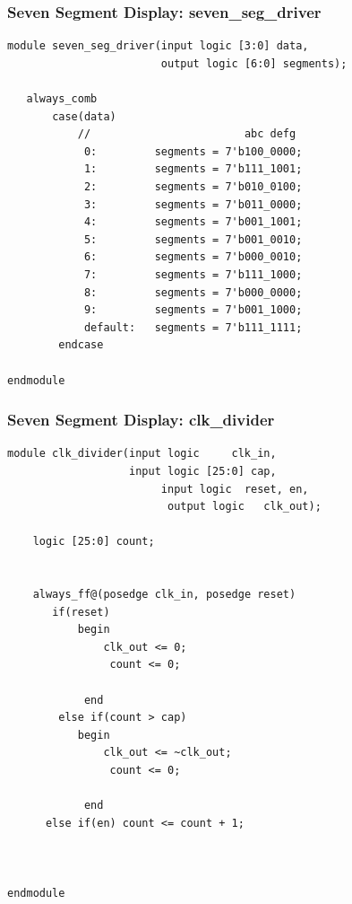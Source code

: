 \documentclass[a4paper]{article}
\begin{document}
\subsubsection{Seven Segment Display: seven_seg_driver}
\begin{Verbatim}
module seven_seg_driver(input logic [3:0] data,
                        output logic [6:0] segments);
								
   always_comb
	   case(data)
		   //                        abc defg
			0:         segments = 7'b100_0000;
			1:         segments = 7'b111_1001;
			2:         segments = 7'b010_0100;
			3:         segments = 7'b011_0000;
			4:         segments = 7'b001_1001;
			5:         segments = 7'b001_0010;
			6:         segments = 7'b000_0010;
			7:         segments = 7'b111_1000;
			8:         segments = 7'b000_0000;
			9:         segments = 7'b001_1000;
			default:   segments = 7'b111_1111;
		endcase
	
endmodule 
\end{Verbatim}

\subsubsection{Seven Segment Display: clk_divider}
\begin{Verbatim}
module clk_divider(input logic     clk_in,
                   input logic [25:0] cap,
					    input logic  reset, en,
						 output logic   clk_out);
   							
	logic [25:0] count;						
   
	
	always_ff@(posedge clk_in, posedge reset)
	   if(reset) 
		   begin
			   clk_out <= 0;
				count <= 0;
			   
			end
		else if(count > cap)
		   begin
			   clk_out <= ~clk_out;
				count <= 0;
			
			end
      else if(en) count <= count + 1;
	
    

endmodule 

\end{Verbatim}
\end{document}
